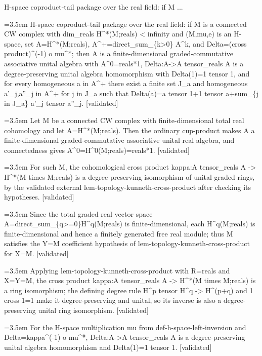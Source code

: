 \documentclass{article}
\newcommand{\step}[1]{\par\noindent\hangindent=3.5em\hangafter=1%
  \makebox[3.5em][l]{\textbf{#1.}}}
\newcommand{\steptag}[1]{\hfill{\small\textsf{[#1]}}}
\begin{document}
\begin{proofbox}{H-space coproduct-tail package over the real field: if M ...}
\step{1} H-space coproduct-tail package over the real field: if M is a connected CW complex with dim\_reals H\textasciicircum{}*(M;reals) < infinity and (M,mu,e) is an H-space, set A=H\textasciicircum{}*(M;reals), A\textasciicircum{}+=direct\_sum\_\{k>0\} A\textasciicircum{}k, and Delta=(cross product)\textasciicircum{}(-1) o mu\textasciicircum{}*; then A is a finite-dimensional graded-commutative associative unital algebra with A\textasciicircum{}0=reals*1, Delta:A->A tensor\_reals A is a degree-preserving unital algebra homomorphism with Delta(1)=1 tensor 1, and for every homogeneous a in A\textasciicircum{}+ there exist a finite set J\_a and homogeneous a'\_j,a''\_j in A\textasciicircum{}+ for j in J\_a such that Delta(a)=a tensor 1+1 tensor a+sum\_\{j in J\_a\} a'\_j tensor a''\_j. \steptag{validated} \\[6pt]
\step{1.1} Let M be a connected CW complex with finite-dimensional total real cohomology and let A=H\textasciicircum{}*(M;reals). Then the ordinary cup-product makes A a finite-dimensional graded-commutative associative unital real algebra, and connectedness gives A\textasciicircum{}0=H\textasciicircum{}0(M;reals)=reals*1. \steptag{validated} \\[4pt]
\step{1.2} For such M, the cohomological cross product kappa:A tensor\_reals A -> H\textasciicircum{}*(M times M;reals) is a degree-preserving isomorphism of unital graded rings, by the validated external lem-topology-kunneth-cross-product after checking its hypotheses. \steptag{validated} \\[6pt]
\step{1.2.1} Since the total graded real vector space A=direct\_sum\_\{q>=0\}H\textasciicircum{}q(M;reals) is finite-dimensional, each H\textasciicircum{}q(M;reals) is finite-dimensional and hence a finitely generated free real module; thus M satisfies the Y=M coefficient hypothesis of lem-topology-kunneth-cross-product for X=M. \steptag{validated} \\[4pt]
\step{1.2.2} Applying lem-topology-kunneth-cross-product with R=reals and X=Y=M, the cross product kappa:A tensor\_reals A -> H\textasciicircum{}*(M times M;reals) is a ring isomorphism; the defining degree rule H\textasciicircum{}p tensor H\textasciicircum{}q -> H\textasciicircum{}(p+q) and 1 cross 1=1 make it degree-preserving and unital, so its inverse is also a degree-preserving unital ring isomorphism. \steptag{validated} \\[4pt]
\step{1.3} For the H-space multiplication mu from def-h-space-left-inversion and Delta=kappa\textasciicircum{}(-1) o mu\textasciicircum{}*, Delta:A->A tensor\_reals A is a degree-preserving unital algebra homomorphism and Delta(1)=1 tensor 1. \steptag{validated} \\[6pt]

\end{proofbox}
\end{document}
